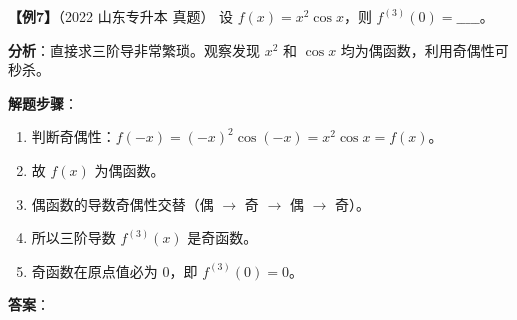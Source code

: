 \documentclass[12pt,a4paper]{article}
\begin{document}
\vspace{1em}

\textbf{【例7】}（2022 山东专升本 真题）
设 $f(x) = x^2 \cos x$，则 $f^{(3)}(0) = \_\_\_\_\_$。

\begin{tiptip}
\textbf{分析}：直接求三阶导非常繁琐。观察发现 $x^2$ 和 $\cos x$ 均为偶函数，利用奇偶性可秒杀。
\end{tiptip}

\textbf{解题步骤}：
\begin{enumerate}
    \item 判断奇偶性：$f(-x) = (-x)^2 \cos(-x) = x^2 \cos x = f(x)$。
    \item 故 $f(x)$ 为偶函数。
    \item 偶函数的导数奇偶性交替（偶 $\to$ 奇 $\to$ 偶 $\to$ 奇）。
    \item 所以三阶导数 $f^{(3)}(x)$ 是奇函数。
    \item 奇函数在原点值必为 0，即 $f^{(3)}(0) = 0$。
\end{enumerate}
\textbf{答案}：
\end{document}

